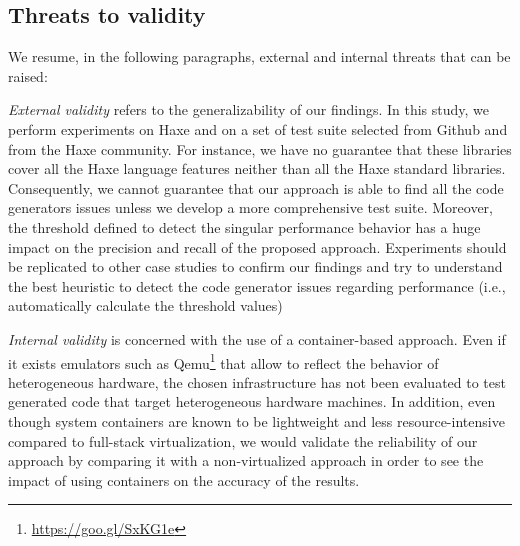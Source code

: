 \subsection{Threats to validity}
We resume, in the following paragraphs, external and internal threats that can be raised:

\textit{External validity} refers to the generalizability of our findings. In this study, we perform experiments on Haxe and on a set of test suite selected from Github and from the Haxe community. For instance, we have no guarantee that these libraries cover all the Haxe language features neither than all the Haxe standard libraries. Consequently, we cannot guarantee that our approach is able to find all the code generators issues unless we develop a more comprehensive test suite. Moreover, the threshold defined to detect the singular performance behavior has a huge impact on the precision and recall of the proposed approach. Experiments should be replicated to other case studies to confirm our findings and try to understand the best heuristic to detect the code generator issues regarding performance (i.e., automatically calculate the threshold values)

\textit{Internal validity} is concerned with the use of a container-based approach. Even if it exists emulators such as Qemu\footnote{\url{https://goo.gl/SxKG1e}} that allow to reflect the behavior of heterogeneous hardware, the chosen infrastructure has not been evaluated to test generated code that target heterogeneous hardware machines. In addition, even though system containers are known to be lightweight and less resource-intensive compared to full-stack virtualization, we would validate the reliability of our approach by comparing it with a non-virtualized approach in order to see the impact of using containers on the accuracy of the results.







